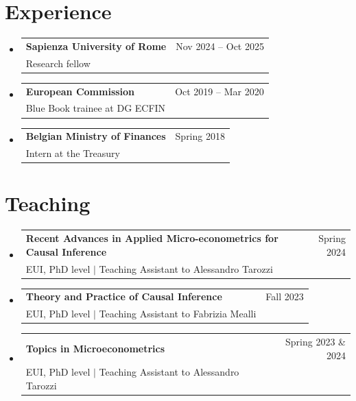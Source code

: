 \documentclass[12pt, a4paper]{article}
\makeatletter
\newcommand{\CVItem}[1]{
  \item\small{
    {#1 \vspace{-2pt}}
  }
}
\newcommand{\CVSubheading}[4]{
  \vspace{-2pt}\item
    \begin{tabular*}{0.97\textwidth}[t]{l@{\extracolsep{\fill}}r}
      \textbf{#1} & #2 \\
      \small#3 & \small #4 \\
    \end{tabular*}\vspace{-7pt}
}
\newcommand{\CVSubHeadingListStart}{\begin{itemize}[leftmargin=0.5cm, label={}]}
\newcommand{\CVSubHeadingListEnd}{\end{itemize}}
\newcommand{\CVItemListStart}{\begin{itemize}}
\newcommand{\CVItemListEnd}{\end{itemize}\vspace{-5pt}}
\makeatother
\begin{document}

\section{Experience}
  \CVSubHeadingListStart
    \CVSubheading
      {Sapienza University of Rome}{Nov 2024 -- Oct 2025}
      {Research fellow}{}
    \CVSubheading
      {European Commission}{Oct 2019 -- Mar 2020}
      {Blue Book trainee at DG ECFIN}{}
    \CVSubheading
      {Belgian Ministry of Finances}{Spring 2018}
      {Intern at the Treasury}{}
  \CVSubHeadingListEnd



\section{Teaching}
  \CVSubHeadingListStart
    \CVSubheading
      {{Recent Advances in Applied Micro-econometrics for Causal Inference}}{Spring 2024}
      {EUI, PhD level $|$ Teaching Assistant to Alessandro Tarozzi} {}
     \CVSubheading
      {{Theory and Practice of Causal Inference}}{Fall 2023}
      {EUI, PhD level $|$ Teaching Assistant to Fabrizia Mealli} {}
    \CVSubheading
      {{Topics in Microeconometrics}}{Spring 2023 \& 2024}
      {EUI, PhD level $|$ Teaching Assistant to Alessandro Tarozzi} {}
  \CVSubHeadingListEnd



 

\end{document}

